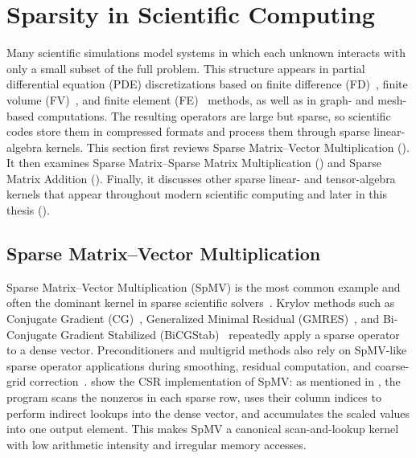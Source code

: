 \section{Sparsity in Scientific Computing} \label{sec:sparsity-in-scientific-computing} %

Many scientific simulations model systems in which each unknown interacts with only a small subset of the full problem. This structure appears in partial differential equation (PDE) discretizations based on finite difference (FD)~\cite{leveque2007finite}, finite volume (FV)~\cite{leveque2002finitevolume}, and finite element (FE)~\cite{zienkiewicz2013finiteelement} methods, as well as in graph- and mesh-based computations. The resulting operators are large but sparse, so scientific codes store them in compressed formats and process them through sparse linear-algebra kernels. This section first reviews Sparse Matrix--Vector Multiplication (). It then examines Sparse Matrix--Sparse Matrix Multiplication () and Sparse Matrix Addition (). Finally, it discusses other sparse linear- and tensor-algebra kernels that appear throughout modern scientific computing and later in this thesis ().

\subsection{Sparse Matrix--Vector Multiplication} \label{sec:background-spmv} %

Sparse Matrix--Vector Multiplication (SpMV) is the most common example and often the dominant kernel in sparse scientific solvers~\cite{barrett1994book}. Krylov methods such as Conjugate Gradient (CG)~\cite{hestenes1952methods}, Generalized Minimal Residual (GMRES)~\cite{saad1986gmres}, and Bi-Conjugate Gradient Stabilized (BiCGStab)~\cite{vandervorst1992bicgstab} repeatedly apply a sparse operator to a dense vector. Preconditioners and multigrid methods also rely on SpMV-like sparse operator applications during smoothing, residual computation, and coarse-grid correction~\cite{barrett1994book}.  show the CSR implementation of SpMV: as mentioned in , the program scans the nonzeros in each sparse row, uses their column indices to perform indirect lookups into the dense vector, and accumulates the scaled values into one output element. This makes SpMV a canonical scan-and-lookup kernel with low arithmetic intensity and irregular memory accesses.


